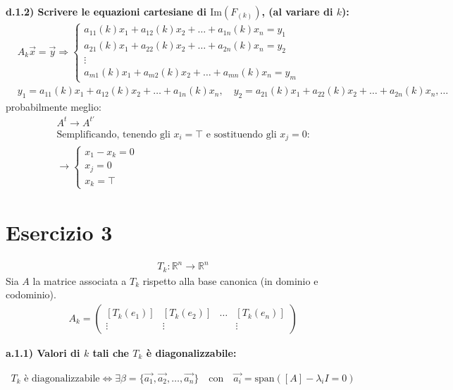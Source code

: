 \documentclass[a4paper,12pt]{article}
\begin{document}
\textbf{d.1.2) Scrivere le equazioni cartesiane di $\text{Im}(F_{(k)})$, (al variare di $k$):}
\begin{align*}
    &A_k\vec{x} = \vec{y} \Rightarrow 
    \begin{cases}
        a_{11}(k)x_1 + a_{12}(k)x_2 + \dots + a_{1n}(k)x_n = y_1 \\
        a_{21}(k)x_1 + a_{22}(k)x_2 + \dots + a_{2n}(k)x_n = y_2 \\
        \vdots \\
        a_{m1}(k)x_1 + a_{m2}(k)x_2 + \dots + a_{mn}(k)x_n = y_m
    \end{cases} \\
    &\boxed{y_1 = a_{11}(k)x_1 + a_{12}(k)x_2 + \dots + a_{1n}(k)x_n, \quad y_2 = a_{21}(k)x_1 + a_{22}(k)x_2 + \dots + a_{2n}(k)x_n, \dots}
\end{align*}
probabilmente meglio:
\begin{align}
    A^t \to A^{t'} \\
    \text{Semplificando, tenendo gli $x_i=\top$  e sostituendo gli $x_j=0$:} \\ 
    \to \begin{cases}
        \boxed{x_1-x_k=0} \\
        x_j=0 \\
        x_k=\top
    \end{cases}
\end{align}


\pagebreak
\section*{Esercizio 3}
\begin{align*}
    T_k : \mathbb{R}^n \to \mathbb{R}^n
\end{align*}
Sia \( A \) la matrice associata a \( T_k \) rispetto alla base canonica (in dominio e codominio).
\begin{align*}
    A_k = \begin{pmatrix}
        [T_k(e_1)] & [T_k(e_2)] & \dots & [T_k(e_n)] \\
        \vdots & \vdots & & \vdots
    \end{pmatrix}
\end{align*}

\textbf{a.1.1) Valori di \( k \) tali che \( T_k \) è diagonalizzabile:}

\begin{align*}
    T_k \text{ è diagonalizzabile} \iff \exists \beta = \{ \vec{a_1}, \vec{a_2}, \dots, \vec{a_n} \} \quad \text{con} \quad \vec{a_i} = \text{span}\left( [A] - \lambda_i I = 0 \right)
\end{align*}
\end{document}
